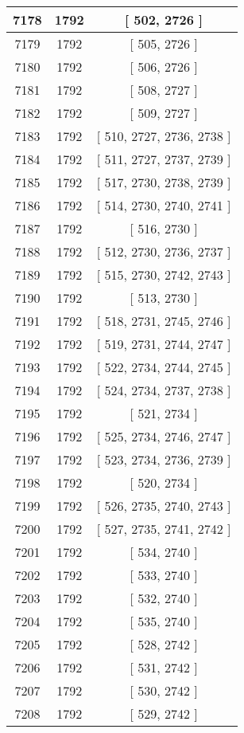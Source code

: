 \begin{center}
\begin{longtable}[H]{|| c c c ||}
7178 & 1792 & [ 502, 2726 ] \\ 
\hline
7179 & 1792 & [ 505, 2726 ] \\ 
\hline
7180 & 1792 & [ 506, 2726 ] \\ 
\hline
7181 & 1792 & [ 508, 2727 ] \\ 
\hline
7182 & 1792 & [ 509, 2727 ] \\ 
\hline
7183 & 1792 & [ 510, 2727, 2736, 2738 ] \\ 
\hline
7184 & 1792 & [ 511, 2727, 2737, 2739 ] \\ 
\hline
7185 & 1792 & [ 517, 2730, 2738, 2739 ] \\ 
\hline
7186 & 1792 & [ 514, 2730, 2740, 2741 ] \\ 
\hline
7187 & 1792 & [ 516, 2730 ] \\ 
\hline
7188 & 1792 & [ 512, 2730, 2736, 2737 ] \\ 
\hline
7189 & 1792 & [ 515, 2730, 2742, 2743 ] \\ 
\hline
7190 & 1792 & [ 513, 2730 ] \\ 
\hline
7191 & 1792 & [ 518, 2731, 2745, 2746 ] \\ 
\hline
7192 & 1792 & [ 519, 2731, 2744, 2747 ] \\ 
\hline
7193 & 1792 & [ 522, 2734, 2744, 2745 ] \\ 
\hline
7194 & 1792 & [ 524, 2734, 2737, 2738 ] \\ 
\hline
7195 & 1792 & [ 521, 2734 ] \\ 
\hline
7196 & 1792 & [ 525, 2734, 2746, 2747 ] \\ 
\hline
7197 & 1792 & [ 523, 2734, 2736, 2739 ] \\ 
\hline
7198 & 1792 & [ 520, 2734 ] \\ 
\hline
7199 & 1792 & [ 526, 2735, 2740, 2743 ] \\ 
\hline
7200 & 1792 & [ 527, 2735, 2741, 2742 ] \\ 
\hline
7201 & 1792 & [ 534, 2740 ] \\ 
\hline
7202 & 1792 & [ 533, 2740 ] \\ 
\hline
7203 & 1792 & [ 532, 2740 ] \\ 
\hline
7204 & 1792 & [ 535, 2740 ] \\ 
\hline
7205 & 1792 & [ 528, 2742 ] \\ 
\hline
7206 & 1792 & [ 531, 2742 ] \\ 
\hline
7207 & 1792 & [ 530, 2742 ] \\ 
\hline
7208 & 1792 & [ 529, 2742 ] \\ 

\end{longtable}
\end{center}
